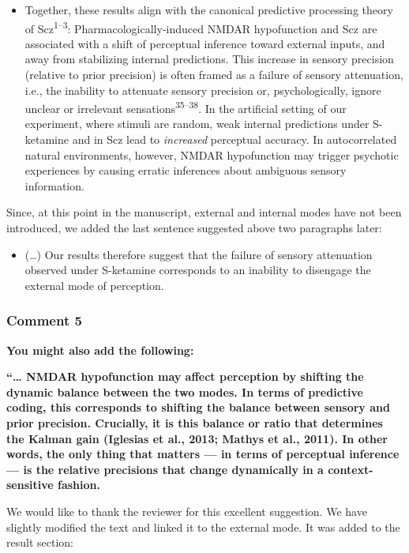 \documentclass[
]{article}
\providecommand{\tightlist}{%
  \setlength{\itemsep}{0pt}\setlength{\parskip}{0pt}}
\begin{document}
\begin{itemize}
\tightlist
\item
  Together, these results align with the canonical predictive processing
  theory of Scz\textsuperscript{1--3}: Pharmacologically-induced NMDAR
  hypofunction and Scz are associated with a shift of perceptual
  inference toward external inputs, and away from stabilizing internal
  predictions. This increase in sensory precision (relative to prior
  precision) is often framed as a failure of sensory attenuation, i.e.,
  the inability to attenuate sensory precision or, psychologically,
  ignore unclear or irrelevant sensations\textsuperscript{35--38}. In
  the artificial setting of our experiment, where stimuli are random,
  weak internal predictions under S-ketamine and in Scz lead to
  \emph{increased} perceptual accuracy. In autocorrelated natural
  environments, however, NMDAR hypofunction may trigger psychotic
  experiences by causing erratic inferences about ambiguous sensory
  information.
\end{itemize}

Since, at this point in the manuscript, external and internal modes have
not been introduced, we added the last sentence suggested above two
paragraphs later:

\begin{itemize}
\tightlist
\item
  (\ldots) Our results therefore suggest that the failure of sensory
  attenuation observed under S-ketamine corresponds to an inability to
  disengage the external mode of perception.
\end{itemize}

\subsubsection{Comment 5}\label{comment-5}

\textbf{You might also add the following:}

\textbf{``\ldots{} NMDAR hypofunction may affect perception by shifting
the dynamic balance between the two modes. In terms of predictive
coding, this corresponds to shifting the balance between sensory and
prior precision. Crucially, it is this balance or ratio that determines
the Kalman gain (Iglesias et al., 2013; Mathys et al., 2011). In other
words, the only thing that matters --- in terms of perceptual inference
--- is the relative precisions that change dynamically in a
context-sensitive fashion.}

We would like to thank the reviewer for this excellent suggestion. We
have slightly modified the text and linked it to the external mode. It
was added to the result section:
\end{document}
